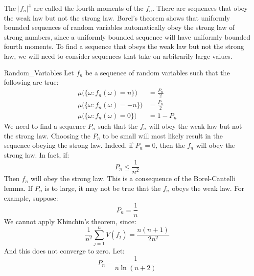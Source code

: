     The $|f_{n}|^{4}$ are called the fourth moments of the
    $f_{n}$. There are sequences that obey the weak law but
    not the strong law. Borel's theorem shows that uniformly
    bounded sequences of random variables automatically obey
    the strong law of strong numbers, since a uniformly
    bounded sequence will have uniformly bounded fourth
    moments. To find a sequence that obeys the weak law but
    not the strong law, we will need to consider sequences
    that take on arbitrarily large values.
    \begin{lexample}{}{Random_Variables}
        Let $f_{n}$ be a sequence of random variables such that
        the following are true:
        \begin{subequations}
            \begin{align}
                \mu\Big(\{\omega:f_{n}(\omega)=n\}\Big)
                &=\frac{P_{n}}{2}\\
                \mu\Big(\{\omega:f_{n}(\omega)=\minus{n}\}\Big)
                &=\frac{P_{n}}{2}\\
                \mu\Big(\{\omega:f_{n}(\omega)=0\}\Big)
                &=1-P_{n}
            \end{align}
        \end{subequations}
        We need to find a sequence $P_{n}$ such that the
        $f_{n}$ will obey the weak law but not the strong law.
        Choosing the $P_{n}$ to be small will most likely
        result in the sequence obeying the strong law. Indeed,
        if $P_{n}=0$, then the $f_{n}$ will obey the strong
        law. In fact, if:
        \begin{equation}
            P_{n}\leq\frac{1}{n^{2}}
        \end{equation}
        Then $f_{n}$ will obey the strong law. This is a
        consequence of the Borel-Cantelli lemma. If $P_{n}$
        is to large, it may not be true that the $f_{n}$ obeys
        the weak law. For example, suppose:
        \begin{equation}
            P_{n}=\frac{1}{n}
        \end{equation}
        We cannot apply Khinchin's theorem, since:
        \begin{equation}
            \frac{1}{n^{2}}\sum_{j=1}^{n}V(f_{j})=
            \frac{n(n+1)}{2n^{2}}
        \end{equation}
        And this does not converge to zero. Let:
        \begin{equation}
            P_{n}=\frac{1}{n\ln(n+2)}

\end{equation}
\end{lexample}
